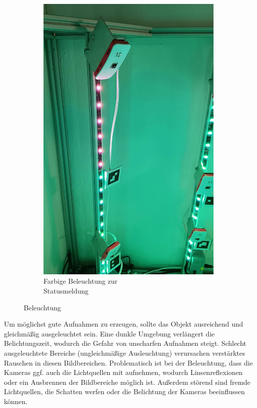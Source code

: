 \documentclass[./00PhotoBox.tex]{subfiles}
\begin{document}
\begin{figure}[htbp]
\begin{subfigure}{0.45\textwidth}
        \includegraphics[height=1.2\linewidth]{./img/3_aufbau/beleuchtung_farbig.jpg}
        \centering
        \caption{Farbige Beleuchtung zur\\Statusmeldung}
        \label{img:led_farbig}
    \end{subfigure}
    \caption{Beleuchtung}
\end{figure}

Um möglichst gute Aufnahmen zu erzeugen, sollte das Objekt ausreichend und gleichmäßig ausgeleuchtet sein. Eine dunkle Umgebung verlängert die Belichtungszeit, wodurch die Gefahr von unscharfen Aufnahmen steigt. Schlecht ausgeleuchtete Bereiche (ungleichmäßige Ausleuchtung) verursachen verstärktes Rauschen in diesen Bildbereichen. Problematisch ist bei der Beleuchtung, dass die Kameras ggf. auch die Lichtquellen mit aufnehmen, wodurch Linsenreflexionen oder ein Ausbrennen der Bildbereiche möglich ist. Außerdem störend sind fremde Lichtquellen, die Schatten werfen oder die Belichtung der Kameras beeinflussen können.
\end{document}

